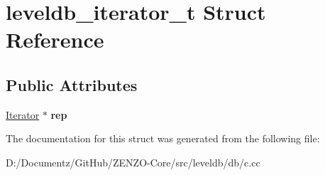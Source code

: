 \hypertarget{structleveldb__iterator__t}{}\section{leveldb\+\_\+iterator\+\_\+t Struct Reference}
\label{structleveldb__iterator__t}
\subsection*{Public Attributes}
\begin{DoxyCompactItemize}
\item 
\mbox{\label{structleveldb__iterator__t_a051a1df01c49d34f34628ae1467f9377}} 
\mbox{\hyperlink{classleveldb_1_1_iterator}{Iterator}} $\ast$ {\bfseries rep}
\end{DoxyCompactItemize}


The documentation for this struct was generated from the following file\+:\begin{DoxyCompactItemize}
\item 
D\+:/\+Documentz/\+Git\+Hub/\+Z\+E\+N\+Z\+O-\/\+Core/src/leveldb/db/c.\+cc\end{DoxyCompactItemize}
